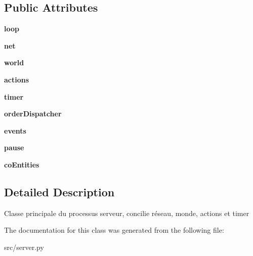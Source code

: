 \subsection*{Public Attributes}
\begin{DoxyCompactItemize}
\item 
\hypertarget{classsrc_1_1server_1_1_server_ab2030f2ecb47bda84d60911ca3160b54}{}\label{classsrc_1_1server_1_1_server_ab2030f2ecb47bda84d60911ca3160b54} 
{\bfseries loop}
\item 
\hypertarget{classsrc_1_1server_1_1_server_ad34d86b9dcf48b265b7ad8bd900d04e5}{}\label{classsrc_1_1server_1_1_server_ad34d86b9dcf48b265b7ad8bd900d04e5} 
{\bfseries net}
\item 
\hypertarget{classsrc_1_1server_1_1_server_a5d20f9b0fe55640af8e93cb47411d64b}{}\label{classsrc_1_1server_1_1_server_a5d20f9b0fe55640af8e93cb47411d64b} 
{\bfseries world}
\item 
\hypertarget{classsrc_1_1server_1_1_server_aa21a201ebc793109dee562b6e2f6aa0e}{}\label{classsrc_1_1server_1_1_server_aa21a201ebc793109dee562b6e2f6aa0e} 
{\bfseries actions}
\item 
\hypertarget{classsrc_1_1server_1_1_server_a3e70ee05d9d5f91e81569c59da3cbce0}{}\label{classsrc_1_1server_1_1_server_a3e70ee05d9d5f91e81569c59da3cbce0} 
{\bfseries timer}
\item 
\hypertarget{classsrc_1_1server_1_1_server_abd9ce5712c56d7337132daa5b9c92994}{}\label{classsrc_1_1server_1_1_server_abd9ce5712c56d7337132daa5b9c92994} 
{\bfseries order\+Dispatcher}
\item 
\hypertarget{classsrc_1_1server_1_1_server_ab9e4c5dfe23adbcd3b278b7b04c3d783}{}\label{classsrc_1_1server_1_1_server_ab9e4c5dfe23adbcd3b278b7b04c3d783} 
{\bfseries events}
\item 
\hypertarget{classsrc_1_1server_1_1_server_af27c7bccdf32aa95b87b661e4f065a49}{}\label{classsrc_1_1server_1_1_server_af27c7bccdf32aa95b87b661e4f065a49} 
{\bfseries pause}
\item 
\hypertarget{classsrc_1_1server_1_1_server_a319ab717e0d6fb53a32d68d341de5463}{}\label{classsrc_1_1server_1_1_server_a319ab717e0d6fb53a32d68d341de5463} 
{\bfseries co\+Entities}
\end{DoxyCompactItemize}


\subsection{Detailed Description}
\begin{DoxyVerb}Classe principale du processus serveur, concilie réseau, monde, actions et timer \end{DoxyVerb}
 

The documentation for this class was generated from the following file\+:\begin{DoxyCompactItemize}
\item 
src/server.\+py\end{DoxyCompactItemize}
